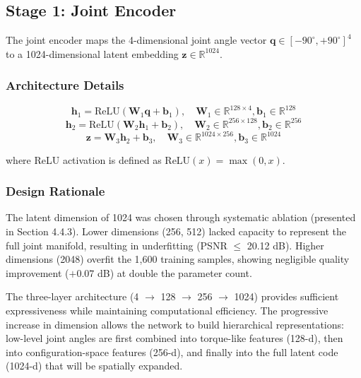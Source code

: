 \documentclass[12pt,a4paper,oneside]{report}
\begin{document}
\subsection{Stage 1: Joint Encoder}

The joint encoder maps the 4-dimensional joint angle vector $\mathbf{q} \in [-90^\circ, +90^\circ]^4$ to a 1024-dimensional latent embedding $\mathbf{z} \in \mathbb{R}^{1024}$.

\subsubsection{Architecture Details}

\begin{equation}
\mathbf{h}_1 = \text{ReLU}(\mathbf{W}_1 \mathbf{q} + \mathbf{b}_1), \quad \mathbf{W}_1 \in \mathbb{R}^{128 \times 4}, \mathbf{b}_1 \in \mathbb{R}^{128}
\end{equation}
\begin{equation}
\mathbf{h}_2 = \text{ReLU}(\mathbf{W}_2 \mathbf{h}_1 + \mathbf{b}_2), \quad \mathbf{W}_2 \in \mathbb{R}^{256 \times 128}, \mathbf{b}_2 \in \mathbb{R}^{256}
\end{equation}
\begin{equation}
\mathbf{z} = \mathbf{W}_3 \mathbf{h}_2 + \mathbf{b}_3, \quad \mathbf{W}_3 \in \mathbb{R}^{1024 \times 256}, \mathbf{b}_3 \in \mathbb{R}^{1024}
\end{equation}

where ReLU activation is defined as $\text{ReLU}(x) = \max(0, x)$.

\subsubsection{Design Rationale}

The latent dimension of 1024 was chosen through systematic ablation (presented in Section 4.4.3). Lower dimensions (256, 512) lacked capacity to represent the full joint manifold, resulting in underfitting (PSNR $\leq$ 20.12 dB). Higher dimensions (2048) overfit the 1,600 training samples, showing negligible quality improvement ($+0.07$ dB) at double the parameter count.

The three-layer architecture (4 $\rightarrow$ 128 $\rightarrow$ 256 $\rightarrow$ 1024) provides sufficient expressiveness while maintaining computational efficiency. The progressive increase in dimension allows the network to build hierarchical representations: low-level joint angles are first combined into torque-like features (128-d), then into configuration-space features (256-d), and finally into the full latent code (1024-d) that will be spatially expanded.
\end{document}
